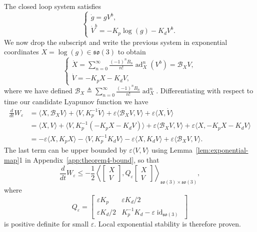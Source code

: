 \documentclass[11pt]{article}
\newcommand{\so}{\mathfrak{so}}
\newcommand{\ad}{\operatorname{ad}}
\newcommand{\id}{\operatorname{id}}
\newcommand{\calB}{\mathcal B}
\newcommand{\eps}{\varepsilon}
\begin{document}
The closed loop system satisfies
\begin{equation*}
\begin{cases}
\dot g=gV^b,\\
\dot V^b=-K_p\log(g)-K_dV^b.
\end{cases}
\end{equation*}
We now drop the subscript and write the previous system in exponential coordinates $X=\log(g)\in\so(3)$ to obtain
\begin{equation*}
\begin{cases}
\displaystyle \dot X=\sum_{n=0}^{\infty}\frac{(-1)^nB_n}{n!}\ad_X^n(V^b)=\calB_XV,\\[4pt]
\dot V=-K_pX-K_dV,
\end{cases}
\end{equation*}
where we have defined $\calB_X\triangleq\sum_{n=0}^{\infty}\frac{(-1)^nB_n}{n!}\ad_X^n$. Differentiating with respect to time our candidate Lyapunov function we have
\begin{align*}
\frac{d}{dt}W_\eps
&=\langle X,\calB_XV\rangle+\langle V,K_p^{-1}\dot V\rangle
+\eps\langle\calB_XV,V\rangle+\eps\langle X,\dot V\rangle\\
&=\langle X,V\rangle+\langle V,K_p^{-1}(-K_pX-K_dV)\rangle
+\eps\langle\calB_XV,V\rangle+\eps\langle X,-K_pX-K_dV\rangle\\
&=-\eps\langle X,K_pX\rangle-\langle V,K_p^{-1}K_dV\rangle-\eps\langle X,K_dV\rangle
+\eps\langle\calB_XV,V\rangle.
\end{align*}
The last term can be upper bounded by $\eps\langle V,V\rangle$ using Lemma~\ref{lem:exponential-map}1 in Appendix~\ref{app:theorem4-bound}, so that
\begin{equation*}
\frac{d}{dt}W_\eps\le -\frac12\left\langle\begin{bmatrix}X\\V\end{bmatrix},Q_\eps\begin{bmatrix}X\\V\end{bmatrix}\right\rangle_{\so(3)\times\so(3)},
\end{equation*}
where
\begin{equation*}
Q_\eps=\begin{bmatrix}\eps K_p&\eps K_d/2\\\eps K_d/2&K_p^{-1}K_d-\eps\id_{\so(3)}\end{bmatrix}
\end{equation*}
is positive definite for small $\eps$. Local exponential stability is therefore proven.
\end{document}
